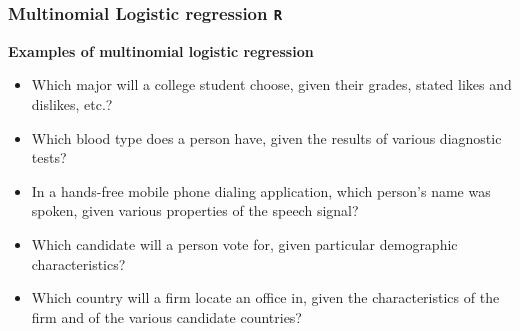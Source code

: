 \documentclass[00-GLMregslides.tex]{subfiles}
\begin{document}
\begin{frame}[fragile]		
	\frametitle{Multinomial Logistic regression \texttt{R} }	
	\Large	
		\textbf{Examples of multinomial logistic regression}
\begin{itemize}		
\item	Which major will a college student choose, given their grades, stated likes and dislikes, etc.?	
\item	Which blood type does a person have, given the results of various diagnostic tests?	
\item	In a hands-free mobile phone dialing application, which person's name was spoken, given various properties of the speech signal?	
\item	Which candidate will a person vote for, given particular demographic characteristics?	
\item	Which country will a firm locate an office in, given the characteristics of the firm and of the various candidate countries?	
\end{itemize}		
\end{frame}		
\end{document}
